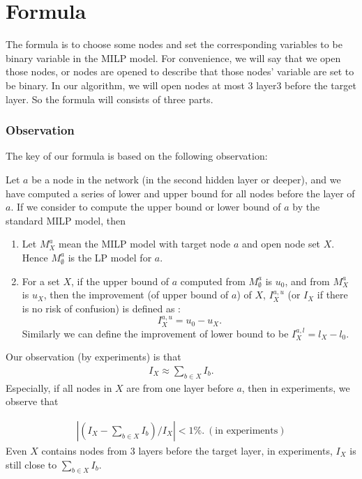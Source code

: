 \section*{Formula}

The formula is to choose some nodes and set the corresponding variables to be binary variable in the MILP model. For convenience, we will say that we open those nodes, or nodes are opened to describe that those nodes' variable are set to be binary. In our algorithm, we will open nodes at most 3 layer3 before the target layer. So the formula will consists of three parts.

\subsubsection*{Observation}

The key of our formula is based on the following observation:

\begin{definition}[Improvement]
	
	Let $a$ be a node in the network (in the second hidden layer or deeper), and we have computed a series of lower and upper bound for all nodes before the layer of $a$. If we consider to compute the upper bound or lower bound of $a$ by the standard MILP model, then
	
	\begin{enumerate}
		\item Let $M^a_X$ mean the MILP model with target node $a$ and open node set $X$. Hence $M^a_{\emptyset}$ is the LP model for $a$.
		
		\item For a set $X$, if the upper bound of $a$ computed from $M^a_{\emptyset}$ is $u_0$, and from $M^a_X$ is $u_X$, then the improvement (of upper bound of $a$) of $X$, $I_X^{a,u}$ (or $I_X$ if there is no risk of confusion) is defined as : $$I_X^{a,u} = u_0-u_X.$$ Similarly we can define the improvement of lower bound to be $I_X^{a,l} = l_X-l_0$.
	\end{enumerate}
\end{definition}



Our observation (by experiments) is that \begin{align}
	I_X \approx \sum_{b\in X} I_b.
\end{align} Especially, if all nodes in $X$ are from one layer before $a$, then in experiments, we observe that 

\begin{align*}
	|(I_X - \sum_{b\in X} I_b)/I_X| < 1\%. \ (\text{in experiments})
\end{align*} Even $X$ contains nodes from 3 layers before the target layer, in experiments, $I_X$ is still close to $\sum_{b\in X} I_b$.

